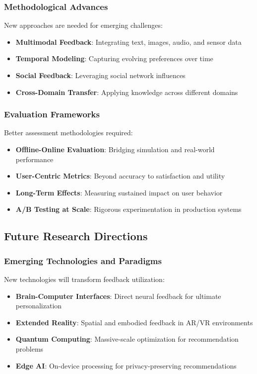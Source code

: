\subsubsection{Methodological Advances}

New approaches are needed for emerging challenges:

\begin{itemize}
    \item \textbf{Multimodal Feedback}: Integrating text, images, audio, and sensor data
    \item \textbf{Temporal Modeling}: Capturing evolving preferences over time
    \item \textbf{Social Feedback}: Leveraging social network influences
    \item \textbf{Cross-Domain Transfer}: Applying knowledge across different domains
\end{itemize}

\subsubsection{Evaluation Frameworks}

Better assessment methodologies required:

\begin{itemize}
    \item \textbf{Offline-Online Evaluation}: Bridging simulation and real-world performance
    \item \textbf{User-Centric Metrics}: Beyond accuracy to satisfaction and utility
    \item \textbf{Long-Term Effects}: Measuring sustained impact on user behavior
    \item \textbf{A/B Testing at Scale}: Rigorous experimentation in production systems
\end{itemize}

\subsection{Future Research Directions}

\subsubsection{Emerging Technologies and Paradigms}

New technologies will transform feedback utilization:

\begin{itemize}
    \item \textbf{Brain-Computer Interfaces}: Direct neural feedback for ultimate personalization
    \item \textbf{Extended Reality}: Spatial and embodied feedback in AR/VR environments
    \item \textbf{Quantum Computing}: Massive-scale optimization for recommendation problems
    \item \textbf{Edge AI}: On-device processing for privacy-preserving recommendations
\end{itemize}

